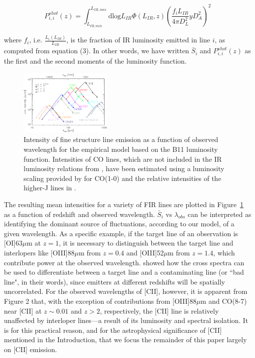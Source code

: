 \documentclass[iop]{emulateapj}
\begin{document}
\begin{equation} \label{eq:pshotlum}
P_{i,i}^{shot}(z) = \int_{L_{IR,min}}^{L_{IR,max}} \mathrm{dlog}L_{IR}  \Phi(L_{IR}, z) \left(\frac{f_{i} L_{IR}}{4 \pi D_{L}^2} y D_A^2\right)^2
\end{equation}

where $f_{i}$, i.e. $\frac{L_{i}(L_{IR})}{L_{IR}}$, is the fraction of IR luminosity emitted in line $i$, as computed from equation (3). In other words, we have written $\bar{S}_{i}$ and $P_{i,i}^{shot}(z)$ as the first and the second moments of the luminosity function.

\begin{figure}[t]
 \centering
 \includegraphics[width=0.4\textwidth]{interloper_intensity_jysr_withM82CO}
\caption{Intensity of fine structure line emission as a function of observed wavelength for the empirical model based on the B11 luminosity function. Intensities of CO lines, which are not included in the IR luminosity relations from \citet{spinoglio12}, have been estimated using a luminosity scaling provided by \citet{carilli11} for CO(1-0) and the relative intensities of the higher-J lines in \citet{bothwell13}.}
\label{fig:interlopers}
\end{figure}

The resulting mean intensities for a variety of FIR lines are plotted in Figure~\ref{fig:interlopers} as a function of redshift and observed wavelength. $\bar{S}_{i}$ vs $\lambda_{obs}$ can be interpreted as identifying the dominant source of fluctuations, according to our model, of a given wavelength. As a specific example, if the target line of an observation is [OI]63$\mu$m at $z = 1$, it is necessary to distinguish between the target line and interlopers like [OIII]88$\mu$m from $z=0.4$ and [OIII]52$\mu$m from $z=1.4$, which contribute power at the observed wavelength. \citet{visbal10} showed how the cross spectra can be used to differentiate between a target line and a contaminating line (or ``bad line", in their words), since emitters at different redshifts will be spatially uncorrelated. For the observed wavelengths of [CII], however, it is apparent from Figure 2 that, with the exception of contributions from [OIII]88$\mu$m and CO(8-7) near [CII] at $z \sim 0.01$ and $z>2$, respectively, the [CII] line is relatively unaffected by interloper lines---a result of its luminosity and spectral isolation. It is for this practical reason, and for the astrophysical significance of [CII] mentioned in the Introduction, that we focus the remainder of this paper largely on [CII] emission.
\end{document}
